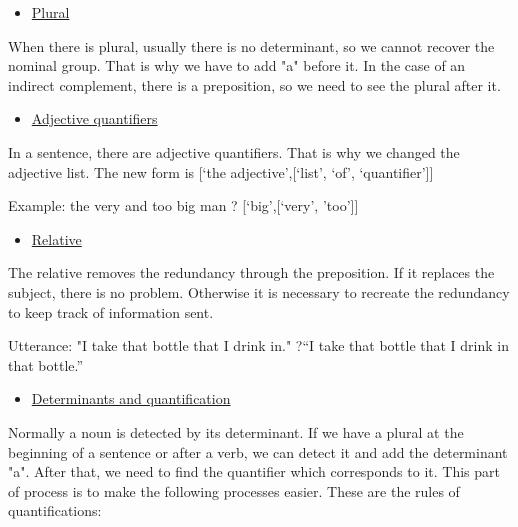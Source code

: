 \documentclass[twoside,a4paper,10pt]{report}
\begin{document}
\begin{itemize}
    \item  \underline{Plural}
\end{itemize}
When there is plural, usually there is no determinant, so we cannot recover the nominal group. That is why we have to add "a" before it. In the case of an indirect complement, there is a preposition, so we need to see the plural after it.



\begin{itemize}
    \item  \underline{Adjective quantifiers}
\end{itemize}
In a sentence, there are adjective quantifiers. That is why we changed the adjective list. The new form is [‘the adjective’,[‘list’, ‘of’, ‘quantifier’]]


\small
\begin{verbatimtab}
  Example: the very and too big man ? [‘big’,[‘very’, ’too’]]
\end{verbatimtab}
\normalsize

\begin{itemize}
    \item  \underline{Relative}
\end{itemize}
The relative removes the redundancy through the preposition. If it replaces the subject, there is no problem. Otherwise it is necessary to recreate the redundancy to keep track of information sent. 


\small
\begin{verbatimtab}
  Utterance: "I take that bottle that I drink in."
  ?“I take that bottle that I drink in that bottle.”
\end{verbatimtab}
\normalsize

\begin{itemize}
    \item  \underline{Determinants and quantification}
\end{itemize}
Normally a noun is detected by its determinant. If we have a plural at the beginning of a sentence or after a verb, we can detect it and add the determinant "a". After that, we need to find the quantifier which corresponds to it. This part of process is to make the following processes easier. These are the rules of quantifications:
\end{document}
